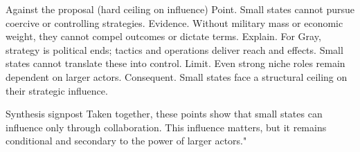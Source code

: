 Against the proposal (hard ceiling on influence)
Point. Small states cannot pursue coercive or controlling strategies.
Evidence. Without military mass or economic weight, they cannot compel outcomes or dictate terms.
Explain. For Gray, strategy is political ends; tactics and operations deliver reach and effects. Small states cannot translate these into control.
Limit. Even strong niche roles remain dependent on larger actors.
Consequent. Small states face a structural ceiling on their strategic influence.

Synthesis signpost
Taken together, these points show that small states can influence only through collaboration. This influence matters, but it remains conditional and secondary to the power of larger actors."

